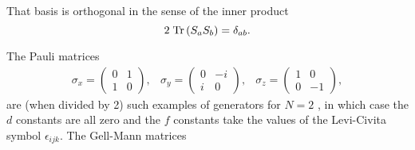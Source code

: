 That basis is orthogonal in the sense of the inner product
\[ 2\; \mbox{\textup{Tr}}\left( S_a S_b \right) =  \delta_{ab}. \]

The Pauli matrices
\[ \begin{array} {ccc}
    \sigma_x= \left( \begin{array} {cc} 0 &1 \\ 1 & 0\end{array} \right), & \sigma_y= \left( \begin{array} {cc} 0 &-i \\ i & 0\end{array} \right) , & \sigma_z=  \left( \begin{array} {cc} 1 &0 \\ 0 & -1 \end{array} \right),\end{array} \]
are (when divided by 2) such examples of generators for $N=2$ , in which case the $d$ constants are all zero and the $f$ constants take the values of the Levi-Civita symbol $\epsilon_{ijk}$. The Gell-Mann matrices
